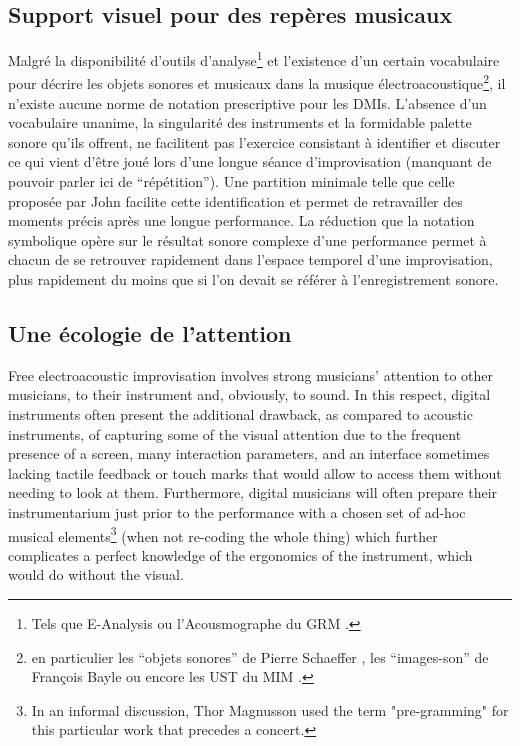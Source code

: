 \subsection{Support visuel pour des repères musicaux}

\noindent Malgré la disponibilité d'outils d'analyse\footnote{Tels que E-Analysis \cite{couprie_eanalysis:_2016} ou l'Acousmographe du \gls{GRM} \cite{favreau_lacousmographe_2010}.} et l'existence d'un certain vocabulaire pour décrire les objets sonores et musicaux dans la musique électroacoustique\footnote{en particulier les ``objets sonores'' de Pierre Schaeffer \cite{schaeffer_traite_1966}, les ``images-son'' de François Bayle \cite{bayle_musique_1993} ou encore les \gls{UST} du \gls{MIM} \cite{delalande_les_1996}.}, il n'existe aucune norme de notation prescriptive pour les \glspl{DMI}. L'absence d'un vocabulaire unanime, la singularité des instruments et la formidable palette sonore qu'ils offrent, ne facilitent pas l'exercice consistant à identifier et discuter ce qui vient d'être joué lors d'une longue séance d'improvisation (manquant de pouvoir parler ici de ``répétition''). Une partition minimale telle que celle proposée par John facilite cette identification et permet de retravailler des moments précis après une longue performance. La réduction que la notation symbolique opère sur le résultat sonore complexe d'une performance permet à chacun de se retrouver rapidement dans l'espace temporel d'une improvisation, plus rapidement du moins que si l'on devait se référer à l'enregistrement sonore.

\subsection{Une écologie de l'attention}

Free electroacoustic improvisation involves strong musicians' attention to other musicians, to their instrument and, obviously, to sound. In this respect, digital instruments often present the additional drawback, as compared to acoustic instruments, of capturing some of the visual attention due to the frequent presence of a screen, many interaction parameters, and an interface sometimes lacking tactile feedback or touch marks that would allow to access them without needing to look at them. Furthermore, digital musicians will often prepare their instrumentarium just prior to the performance with a chosen set of ad-hoc musical elements\footnote{In an informal discussion, Thor Magnusson used the term "pre-gramming" for this particular work that precedes a concert.} (when not re-coding the whole thing) which further complicates a perfect knowledge of the ergonomics of the instrument, which would do without the visual.

